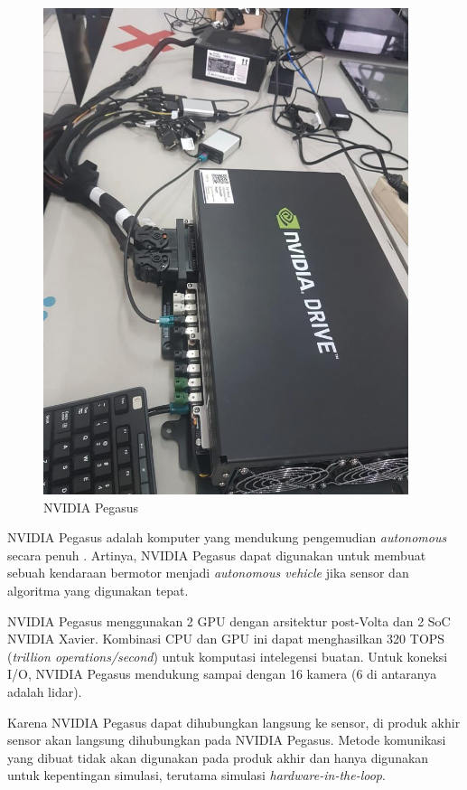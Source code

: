 \begin{figure}[!htbp]
	\centering
	\includegraphics[width=\textwidth,trim={2cm 0cm 0cm 6cm},clip]{resources/chapter-2/pegasus.png}
	\caption{NVIDIA Pegasus \parencite{trilaksono_laporanRispro}}
\end{figure}

NVIDIA Pegasus adalah komputer yang mendukung pengemudian \textit{autonomous}
secara penuh \parencite{oh_2017}. Artinya, NVIDIA Pegasus dapat digunakan untuk
membuat sebuah kendaraan bermotor menjadi \textit{autonomous vehicle} jika
sensor dan algoritma yang digunakan tepat.

NVIDIA Pegasus menggunakan 2 GPU dengan arsitektur post-Volta dan 2 SoC NVIDIA
Xavier. Kombinasi CPU dan GPU ini dapat menghasilkan 320 TOPS (\textit{trillion
	operations/second}) untuk komputasi intelegensi buatan. Untuk koneksi I/O,
NVIDIA Pegasus mendukung sampai dengan 16 kamera (6 di antaranya adalah lidar).

Karena NVIDIA Pegasus dapat dihubungkan langsung ke sensor, di produk akhir
sensor akan langsung dihubungkan pada NVIDIA Pegasus. Metode komunikasi yang
dibuat tidak akan digunakan pada produk akhir dan hanya digunakan untuk
kepentingan simulasi, terutama simulasi \textit{hardware-in-the-loop}.


